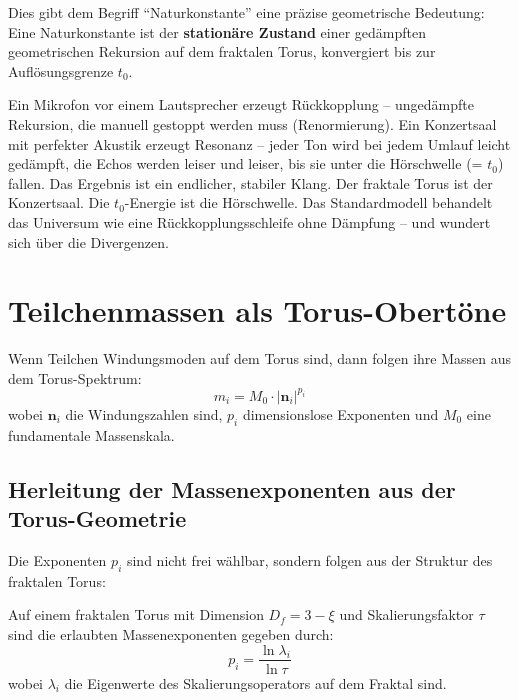 	Dies gibt dem Begriff ``Naturkonstante'' eine präzise geometrische Bedeutung: Eine Naturkonstante ist der \textbf{stationäre Zustand} einer gedämpften geometrischen Rekursion auf dem fraktalen Torus, konvergiert bis zur Auflösungsgrenze $t_0$.
	
	\begin{keypoint}
		Ein Mikrofon vor einem Lautsprecher erzeugt Rückkopplung -- ungedämpfte Rekursion, die manuell gestoppt werden muss (Renormierung). Ein Konzertsaal mit perfekter Akustik erzeugt Resonanz -- jeder Ton wird bei jedem Umlauf leicht gedämpft, die Echos werden leiser und leiser, bis sie unter die Hörschwelle (= $t_0$) fallen. Das Ergebnis ist ein endlicher, stabiler Klang. Der fraktale Torus ist der Konzertsaal. Die $t_0$-Energie ist die Hörschwelle. Das Standardmodell behandelt das Universum wie eine Rückkopplungsschleife ohne Dämpfung -- und wundert sich über die Divergenzen.
	\end{keypoint}
	
	
	\section{Teilchenmassen als Torus-Obertöne}
	
	Wenn Teilchen Windungsmoden auf dem Torus sind, dann folgen ihre Massen aus dem Torus-Spektrum:
	\begin{equation}
		m_i = M_0 \cdot |\mathbf{n}_i|^{p_i}
		\label{eq:mass-scaling}
	\end{equation}
	wobei $\mathbf{n}_i$ die Windungszahlen sind, $p_i$ dimensionslose Exponenten und $M_0$ eine fundamentale Massenskala.
	
	\subsection{Herleitung der Massenexponenten aus der Torus-Geometrie}
	
	Die Exponenten $p_i$ sind nicht frei wählbar, sondern folgen aus der Struktur des fraktalen Torus:
	
	\begin{keypoint}[Massenexponenten]
		Auf einem fraktalen Torus mit Dimension $D_f = 3 - \xi$ und Skalierungsfaktor $\tau$ sind die erlaubten Massenexponenten gegeben durch:
		\begin{equation}
			p_i = \frac{\ln \lambda_i}{\ln \tau}
		\end{equation}
		wobei $\lambda_i$ die Eigenwerte des Skalierungsoperators auf dem Fraktal sind.
	\end{keypoint}
	
